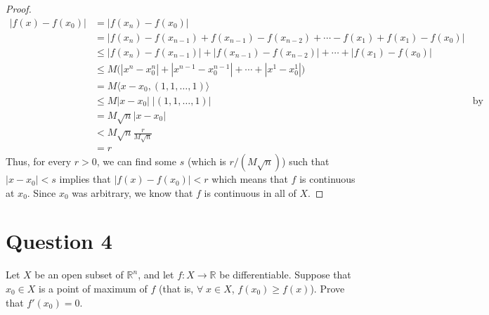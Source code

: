 \documentclass[10pt,a4paper]{article}
\theoremstyle{definition}
\theoremstyle{definition}
\numberwithin{equation}{section}
\begin{document}
\begin{proof}
\begin{align*}
|f(x) - f(x_0)| &= |f(x_n) - f(x_0)|\\
&= |f(x_n) - f(x_{n - 1}) + f(x_{n - 1}) - f(x_{n - 2}) + \cdots - f(x_1) + f(x_1) - f(x_0)|\\
&\leq |f(x_n) - f(x_{n - 1})| + |f(x_{n - 1}) - f(x_{n - 2})| + \cdots + |f(x_1) - f(x_0)|\\
&\leq M \bigg( |x^n - x_0^n| + |x^{n - 1} - x_0^{n - 1}| + \cdots + |x^1 - x_0^1| \bigg)\\
&= M \bigg\langle x - x_0, (1, 1, \ldots, 1) \bigg\rangle\\
&\leq M |x - x_0| \; |(1, 1, \ldots, 1)| &\text{by Cauchy-Schwarz}\\
&= M \sqrt{n} |x - x_0|\\
&< M \sqrt{n} \frac{r}{M \sqrt{n}}\\
&= r
\end{align*}
Thus, for every $r > 0$, we can find some $s$ (which is $r/(M \sqrt{n})$) such that $|x - x_0| < s$ implies that $|f(x) - f(x_0)| < r$ which means that $f$ is continuous at $x_0$. Since $x_0$ was arbitrary, we know that $f$ is continuous in all of $X$. 
\end{proof}

\section*{Question 4}
Let $X$ be an open subset of $\mathbb{R}^n$, and let $f: X \to \mathbb{R}$ be differentiable. Suppose that $x_0 \in X$ is a point of maximum of $f$ (that is, $\forall \; x \in X$, $f(x_0) \geq f(x)$). Prove that $f'(x_0) = 0$. 
\end{document}
